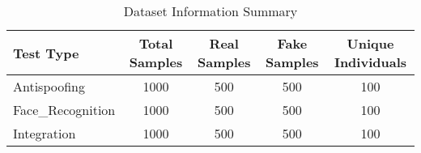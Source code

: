 \begin{table}[htbp]
\centering
\caption{Dataset Information Summary}
\label{tab:dataset_info}
\begin{tabular}{|l|c|c|c|c|}
\hline
\textbf{Test Type} & \textbf{Total Samples} & \textbf{Real Samples} & \textbf{Fake Samples} & \textbf{Unique Individuals} \\
\hline
Antispoofing & 1000 & 500 & 500 & 100 \\
\hline
Face_Recognition & 1000 & 500 & 500 & 100 \\
\hline
Integration & 1000 & 500 & 500 & 100 \\
\hline
\end{tabular}
\end{table}
